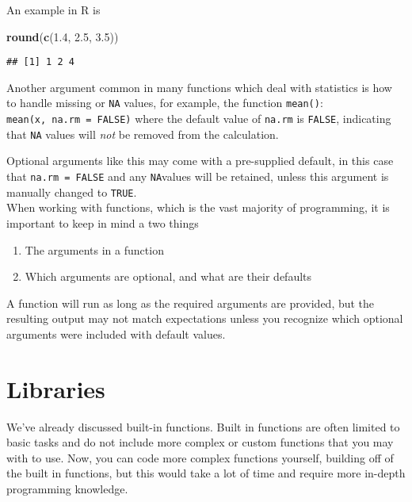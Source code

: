 \documentclass[
]{book}
\newenvironment{Shaded}{\begin{snugshade}}{\end{snugshade}}
\newcommand{\FloatTok}[1]{\textcolor[rgb]{0.00,0.00,0.81}{#1}}
\newcommand{\FunctionTok}[1]{\textcolor[rgb]{0.13,0.29,0.53}{\textbf{#1}}}
\newcommand{\NormalTok}[1]{#1}
\providecommand{\tightlist}{%
  \setlength{\itemsep}{0pt}\setlength{\parskip}{0pt}}
\begin{document}
An example in R is

\begin{Shaded}
\begin{Highlighting}[]
\FunctionTok{round}\NormalTok{(}\FunctionTok{c}\NormalTok{(}\FloatTok{1.4}\NormalTok{, }\FloatTok{2.5}\NormalTok{, }\FloatTok{3.5}\NormalTok{))}
\end{Highlighting}
\end{Shaded}

\begin{verbatim}
## [1] 1 2 4
\end{verbatim}

Another argument common in many functions which deal with statistics is how to handle missing or \texttt{NA} values, for example, the function \texttt{mean()}: \texttt{mean(x,\ na.rm\ =\ FALSE)} where the default value of \texttt{na.rm} is \texttt{FALSE}, indicating that \texttt{NA} values will \emph{not} be removed from the calculation.

Optional arguments like this may come with a pre-supplied default, in this case that \texttt{na.rm\ =\ FALSE} and any \texttt{NA}values will be retained, unless this argument is manually changed to \texttt{TRUE}.\\

When working with functions, which is the vast majority of programming, it is important to keep in mind a two things

\begin{enumerate}
\def\labelenumi{\arabic{enumi}.}
\tightlist
\item
  The arguments in a function
\item
  Which arguments are optional, and what are their defaults
\end{enumerate}

A function will run as long as the required arguments are provided, but the resulting output may not match expectations unless you recognize which optional arguments were included with default values.

\section{Libraries}\label{libraries}

We've already discussed built-in functions. Built in functions are often limited to basic tasks and do not include more complex or custom functions that you may with to use. Now, you can code more complex functions yourself, building off of the built in functions, but this would take a lot of time and require more in-depth programming knowledge.
\end{document}

